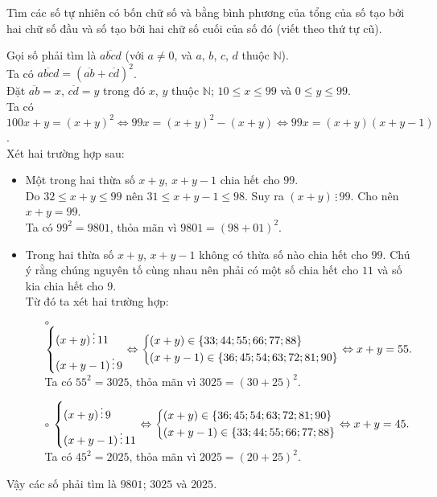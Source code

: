 \begin{bt}
 Tìm các số tự nhiên có bốn chữ số và bằng bình phương của tổng của số tạo bởi hai chữ số đầu và số tạo bởi hai chữ số cuối của số đó (viết theo thứ tự cũ).
 \loigiai
  {
  Gọi số phải tìm là $\overline{abcd}$ (với $a \neq 0$, và $a$, $b$, $c$, $d$ thuộc $\mathbb{N}$).\\
  Ta có $\overline{abcd} = \left( \overline{ab} + \overline{cd} \right)^2$.\\
  Đặt $\overline{ab} = x$, $\overline{cd} = y$ trong đó $x$, $y$ thuộc $\mathbb{N}$; $10 \leq x \leq 99$ và $0 \leq y \leq 99$.\\
  Ta có $100x + y = (x + y)^2 \Leftrightarrow 99x = (x + y)^2 - (x + y) \Leftrightarrow 99x = (x + y)(x + y - 1)$.\\
  Xét hai trường hợp sau:
  \begin{itemize}
   \item Một trong hai thừa số $x + y$, $x + y - 1$ chia hết cho $99$.\\
   Do $32 \leq x + y \leq 99$ nên $31 \leq x + y - 1 \leq 98$. Suy ra $(x + y) \, \vdots \, 99$. Cho nên $x + y = 99$.\\
   Ta có $99^2 = 9801$, thỏa mãn vì $9801 = (98 + 01)^2$.
   \item Trong hai thừa số $x + y$, $x + y - 1$ không có thừa số nào chia hết cho $99$. Chú ý rằng chúng nguyên tố cùng nhau nên phải có một số chia hết cho $11$ và số kia chia hết cho $9$.\\
   Từ đó ta xét hai trường hợp:
   \begin{itemize}
    \item[$\circ$] $\left\{\begin{aligned}& (x + y) \, \vdots \, 11 \\& (x + y - 1) \, \vdots \, 9\end{aligned}\right. \Leftrightarrow \left\{\begin{aligned}& (x + y) \in \{33; 44; 55; 66; 77; 88 \} \\& (x + y - 1) \in \{36; 45; 54; 63; 72; 81; 90 \}\end{aligned}\right. \Leftrightarrow x + y = 55.$\\
    Ta có $55^2 = 3025$, thỏa mãn vì $3025 = (30 + 25)^2$.
    \item[$\circ$] $\left\{\begin{aligned}& (x + y) \, \vdots \, 9 \\& (x + y - 1) \, \vdots \, 11\end{aligned}\right. \Leftrightarrow \left\{\begin{aligned}& (x + y) \in \{36; 45; 54; 63; 72; 81; 90 \} \\& (x + y - 1) \in \{33; 44; 55; 66; 77; 88 \}\end{aligned}\right. \Leftrightarrow x + y = 45.$\\
    Ta có $45^2 = 2025$, thỏa mãn vì $2025 = (20 + 25)^2$.
   \end{itemize}
  \end{itemize}
  Vậy các số phải tìm là $9801$; $3025$ và $2025$.
  }
\end{bt}


